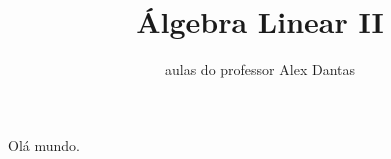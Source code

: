 \documentclass{scrreprt}
\title{Álgebra Linear II}
\author{aulas do professor Alex Dantas}
\begin{document}
\maketitle

Olá mundo.
\end{document}
